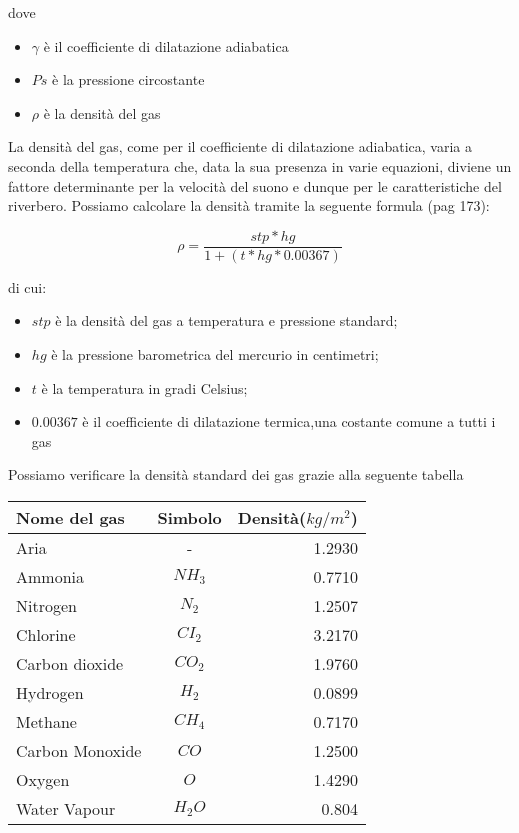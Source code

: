dove

\begin{itemize}
      \item $\gamma$ è il coefficiente di dilatazione adiabatica 
      \item $Ps$ è la pressione circostante
      \item $\rho$ è la densità del gas
\end{itemize}

La densità del gas, come per il coefficiente di dilatazione adiabatica, varia a seconda della temperatura che, data la sua presenza in varie equazioni, diviene un fattore determinante per la velocità del suono e dunque per le caratteristiche del riverbero.
Possiamo calcolare la densità tramite la seguente formula (pag 173):

\begin{equation}
\rho = \frac{stp*hg}{1+(t*hg*0.00367)}
\end{equation}

di cui:

\begin{itemize}
      \item $stp$ è la densità del gas a temperatura e pressione standard;
      \item $hg$ è la pressione barometrica del mercurio in centimetri;
      \item $t$ è la temperatura in gradi Celsius;
      \item $0.00367$ è il  coefficiente di dilatazione termica,una costante comune a tutti i gas
\end{itemize}

Possiamo verificare la densità standard dei gas grazie alla seguente tabella 

\bigskip

\begin{tabular}{lcr}
\toprule
Nome del gas & Simbolo & Densità($kg/m^2$) \\
\midrule
Aria & - & 1.2930 \\
Ammonia & $NH_3$ & 0.7710 \\
Nitrogen & $N_2$ & 1.2507 \\
Chlorine & $CI_2$ & 3.2170 \\
Carbon dioxide & $CO_2$ & 1.9760 \\
Hydrogen & $H_2$ & 0.0899 \\
Methane & $CH_4$ & 0.7170 \\
Carbon Monoxide & $CO$ & 1.2500 \\
Oxygen & $O$ &1.4290 \\
Water Vapour & $H_2O$ & 0.804 \\
\bottomrule
\end{tabular}

